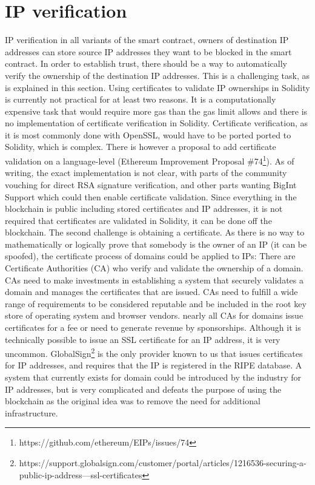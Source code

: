 \section{IP verification}
IP verification in all variants of the smart contract, owners of destination IP addresses can store source IP addresses they want to be blocked in the smart contract. In order to establish trust, there should be a way to automatically verify the ownership of the destination IP addresses. This is a challenging task, as is explained in this section. Using certificates to validate IP ownerships in Solidity is currently not practical for at least two reasons.
It is a computationally expensive task that would require more gas than the gas limit allows and there is no implementation of certificate verification in Solidity. Certificate verification, as it is most commonly done with OpenSSL, would have to be ported ported to Solidity, which is complex.
There is however a proposal to add certificate validation on a language-level (Ethereum Improvement Proposal \#74\footnote{https://github.com/ethereum/EIPs/issues/74}). As of writing, the exact implementation is not clear, with parts of the community vouching for direct RSA signature verification, and other parts wanting BigInt Support which could then enable certificate validation.
Since everything in the blockchain is public including stored certificates and IP addresses, it is not required that certificates are validated in Solidity, it can be done off the blockchain.
The second challenge is obtaining a certificate. As there is no way to mathematically or logically prove that somebody is the owner of an IP (it can be spoofed), the certificate process of domains could be applied to IPs: There are Certificate Authorities (CA) who verify and validate the ownership of a domain. CAs need to make investments in establishing a system that securely validates a domain and manages the certificates that are issued. CAs need to fulfill a wide range of requirements \cite{BaselineRequirements} to be considered reputable and be included in the root key store of operating system and browser vendors. nearly all CAs for domains issue certificates for a fee or need to generate revenue by sponsorships. Although it is technically possible to issue an SSL certificate for an IP address, it is very uncommon. GlobalSign\footnote{https://support.globalsign.com/customer/portal/articles/1216536-securing-a-public-ip-address---ssl-certificates} is the only provider known to us that issues certificates for IP addresses, and requires that the IP is registered in the RIPE database.
A system that currently exists for domain could be introduced by the industry for IP addresses, but is very complicated and defeats the purpose of using the blockchain as the original idea was to remove the need for additional infrastructure.

